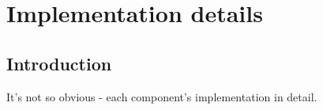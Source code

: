  
%


\chapter{Implementation details}
\label{cha:implementation}



\section{Introduction}
\label{sec:ch6_introdocution}

It's not so obvious - each component's implementation in detail.




